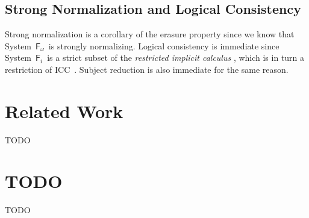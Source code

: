 \documentclass{llncs}
\newcommand{\Fi}{\ensuremath{\mathsf{F}_i}}
\newcommand{\Fw}{\ensuremath{\mathsf{F}_\omega}}
\begin{document}
\subsection{Strong Normalization and Logical Consistency} \label{ssec:sn}
Strong normalization is a corollary of the erasure property since we know that
System~\Fw\ is strongly normalizing. Logical consistency is immediate since
System~\Fi\ is a strict subset of the \emph{restricted implicit calculus}
\cite{Miquel00}, which is in turn a restriction of ICC~\cite{Miquel01}.
Subject reduction is also immediate for the same reason.

\section{Related Work} \label{sec:relwork}
TODO

\section{TODO}
TODO




\end{document}
